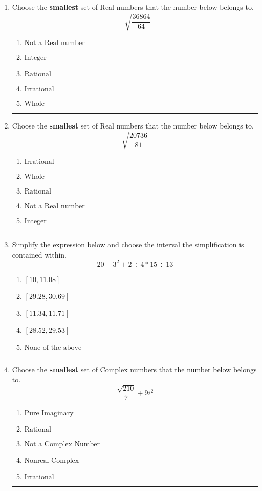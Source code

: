 \documentclass[14pt]{extbook}
\newcommand{\litem}[1]{\item#1\hspace*{-1cm}\rule{\textwidth}{0.4pt}}
\begin{document}
\begin{enumerate}
{\begin{enumerate}[label=\Alph*.]
\end{enumerate} }
\litem{
Choose the \textbf{smallest} set of Real numbers that the number below belongs to.\[ -\sqrt{\frac{36864}{64}} \]\begin{enumerate}[label=\Alph*.]
\item \( \text{Not a Real number} \)
\item \( \text{Integer} \)
\item \( \text{Rational} \)
\item \( \text{Irrational} \)
\item \( \text{Whole} \)

\end{enumerate} }
\litem{
Choose the \textbf{smallest} set of Real numbers that the number below belongs to.\[ \sqrt{\frac{20736}{81}} \]\begin{enumerate}[label=\Alph*.]
\item \( \text{Irrational} \)
\item \( \text{Whole} \)
\item \( \text{Rational} \)
\item \( \text{Not a Real number} \)
\item \( \text{Integer} \)

\end{enumerate} }
\litem{
Simplify the expression below and choose the interval the simplification is contained within.\[ 20 - 3^2 + 2 \div 4 * 15 \div 13 \]\begin{enumerate}[label=\Alph*.]
\item \( [10, 11.08] \)
\item \( [29.28, 30.69] \)
\item \( [11.34, 11.71] \)
\item \( [28.52, 29.53] \)
\item \( \text{None of the above} \)

\end{enumerate} }
\litem{
Choose the \textbf{smallest} set of Complex numbers that the number below belongs to.\[ \frac{\sqrt{210}}{7}+9i^2 \]\begin{enumerate}[label=\Alph*.]
\item \( \text{Pure Imaginary} \)
\item \( \text{Rational} \)
\item \( \text{Not a Complex Number} \)
\item \( \text{Nonreal Complex} \)
\item \( \text{Irrational} \)


\end{enumerate}}
\end{enumerate}
\end{document}
